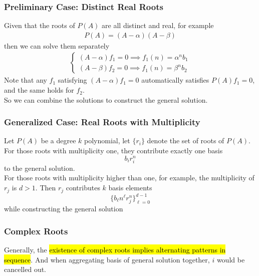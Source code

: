 \documentclass{article}
\begin{document}
				\subsubsection{Preliminary Case: Distinct Real Roots}
					\begin{remark}
						Given that the roots of $P(A)$ are all distinct and real, for example
						\begin{gather}
							P(A) = (A - \alpha) (A - \beta)
						\end{gather}
						then we can solve them separately
						\begin{gather}
							\begin{cases}
								(A - \alpha) f_1 = 0 \implies f_1(n) = \alpha^n b_1 \\
								(A - \beta) f_2 = 0 \implies f_1(n) = \beta^n b_2
							\end{cases}
						\end{gather}
						Note that any $f_1$ satisfying $(A - \alpha) f_1 = 0$ automatically satisfies $P(A) f_1 = 0$, and the same holds for $f_2$.\\
						So we can combine the solutions to construct the general solution.
					\end{remark}
				
				\subsubsection{Generalized Case: Real Roots with Multiplicity}
					\begin{remark}
						Let $P(A)$ be a degree $k$ polynomial, let $\{r_i\}$ denote the set of roots of $P(A)$. For those roots with multiplicity one, they contribute exactly one basis
						\begin{equation}
							b_i r_i^n	
						\end{equation}
						to the general solution. \\For those roots with multiplicity higher than one, for example, the multiplicity of $r_j$ is $d > 1$. Then $r_j$ contributes $k$ basis elements
						\begin{equation}
							\{b_{\ell} n^{\ell} r_j^n\}_{\ell = 0}^{d-1}
						\end{equation}
						while constructing the general solution
					\end{remark}
				
				\subsubsection{Complex Roots}
					\begin{remark}
						Generally, the \hl{existence of complex roots implies alternating patterns in sequence}. And when aggregating basis of general solution together, $i$ would be cancelled out.
					\end{remark}
	
\end{document}
